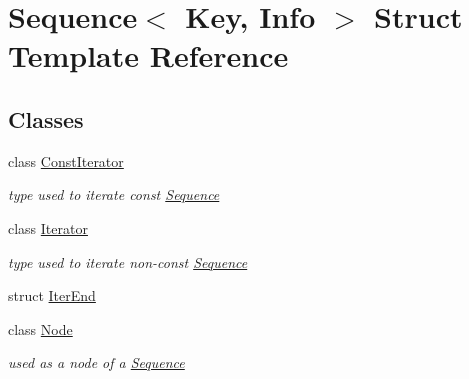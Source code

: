 \hypertarget{structSequence}{}\section{Sequence$<$ Key, Info $>$ Struct Template Reference}
\label{structSequence}
\subsection*{Classes}
\begin{DoxyCompactItemize}
\item 
class \mbox{\hyperlink{structSequence_1_1ConstIterator}{Const\+Iterator}}
\begin{DoxyCompactList}\small\item\em type used to iterate const \mbox{\hyperlink{structSequence}{Sequence}} \end{DoxyCompactList}\item 
class \mbox{\hyperlink{structSequence_1_1Iterator}{Iterator}}
\begin{DoxyCompactList}\small\item\em type used to iterate non-\/const \mbox{\hyperlink{structSequence}{Sequence}} \end{DoxyCompactList}\item 
struct \mbox{\hyperlink{structSequence_1_1IterEnd}{Iter\+End}}
\item 
class \mbox{\hyperlink{structSequence_1_1Node}{Node}}
\begin{DoxyCompactList}\small\item\em used as a node of a \mbox{\hyperlink{structSequence}{Sequence}} \end{DoxyCompactList}\end{DoxyCompactItemize}
